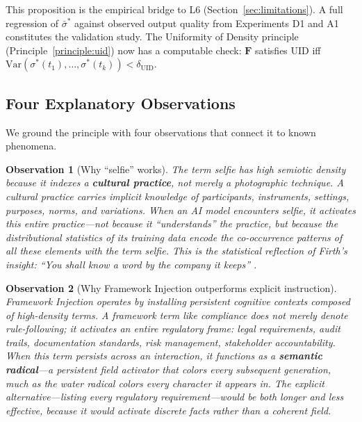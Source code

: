 \documentclass[12pt,a4paper]{article}
\newtheorem{observation}{Observation}[section]
\begin{document}
This proposition is the empirical bridge to L6 (Section~\ref{sec:limitations}).
A full regression of $\bar{\sigma}^*$ against observed output quality from Experiments D1 and A1 constitutes the validation study.
The Uniformity of Density principle (Principle~\ref{principle:uid}) now has a computable check:
$\mathbf{F}$ satisfies UID iff $\mathrm{Var}(\sigma^*(t_1), \ldots, \sigma^*(t_k)) < \delta_{\mathrm{UID}}$.

\subsection{Four Explanatory Observations}

We ground the principle with four observations that connect it to known phenomena.

\begin{observation}[Why ``selfie'' works]
\label{obs:selfie}
The term \textit{selfie} has high semiotic density because it indexes a \textbf{cultural practice}, not merely a photographic technique.
A cultural practice carries implicit knowledge of participants, instruments, settings, purposes, norms, and variations.
When an AI model encounters \textit{selfie}, it activates this entire practice---not because it ``understands'' the practice, but because the distributional statistics of its training data encode the co-occurrence patterns of all these elements with the term \textit{selfie}.
This is the statistical reflection of Firth's insight: ``You shall know a word by the company it keeps'' \cite{firth1957}.
\end{observation}

\begin{observation}[Why Framework Injection outperforms explicit instruction]
\label{obs:fi}
Framework Injection \cite{gomes2026founding} operates by installing persistent cognitive contexts composed of high-density terms.
A framework term like \textit{compliance} does not merely denote rule-following; it activates an entire regulatory frame: legal requirements, audit trails, documentation standards, risk management, stakeholder accountability.
When this term persists across an interaction, it functions as a \textbf{semantic radical}---a persistent field activator that colors every subsequent generation, much as the water radical  colors every character it appears in.
The explicit alternative---listing every regulatory requirement---would be both longer and less effective, because it would activate discrete facts rather than a coherent field.
\end{observation}
\end{document}
